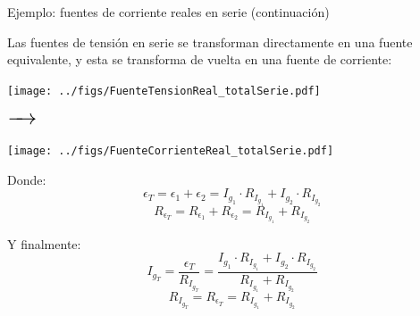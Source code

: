 \documentclass[aspectratio=169, xcolor={usenames,svgnames,dvipsnames}]{beamer}
\begin{document}

\begin{frame}{Ejemplo: \hspace{3mm}fuentes de corriente reales en serie \hspace{3mm}(continuación)}

    \vspace{1mm}
    Las fuentes de tensión en serie se transforman directamente en una fuente equivalente, y esta se transforma de vuelta en una fuente de corriente:

    \begin{minipage}[c]{0.15\linewidth}
        \begin{center}
        \texttt{[image: ../figs/FuenteTensionReal\_totalSerie.pdf]}
        \end{center}
    \end{minipage}
    \begin{minipage}[c]{0.08\linewidth}
        $\LARGE \xrightarrow{\hspace*{0.5cm}}$ %
    \end{minipage}
    \begin{minipage}[c]{0.15\linewidth}
        \begin{center}
        \texttt{[image: ../figs/FuenteCorrienteReal\_totalSerie.pdf]}
        \end{center}
    \end{minipage}
    \begin{minipage}[c]{0.08\linewidth}
        \hfill
    \end{minipage}
    \begin{minipage}[c]{0.47\linewidth}
        \vspace{4mm}
        Donde:
        \[
          \epsilon_T = \epsilon_1 + \epsilon_2 = I_{g_1} \cdot R_{I_{g_1}} + I_{g_2} \cdot R_{I_{g_2}}
        \]  
        \[
          R_{\epsilon_T} = R_{\epsilon_1} + R_{\epsilon_2} = R_{I_{g_1}} + R_{I_{g_2}}
        \] 

        \vspace{2mm}
        Y finalmente:
        \[
          \boxed{
          I_{g_T} = \frac{\epsilon_T}{R_{I_{g_T}}} = \frac{I_{g_1} \cdot R_{I_{g_1}} + I_{g_2} \cdot R_{I_{g_2}}}{R_{I_{g_1}} + R_{I_{g_2}}}
          }
        \]
        \[
          \boxed{
          R_{I_{g_T}} = R_{\epsilon_T} = R_{I_{g_1}} + R_{I_{g_2}}
          }
        \]
    \end{minipage}
\end{frame}
\end{document}
